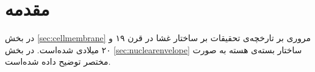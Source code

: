 \setRL
\clearpage
{} 

\def \MemBio {\Mempath /MembraneBio}

\section{
مقدمه
}
در بخش
\ref{sec:cellmembrane}
مروری بر تارخچه‌ی تحقیقات بر ساختار غشا در قرن ۱۹ و ۲۰ میلادی شده‌است. در بخش
\ref{sec:nuclearenvelope}
ساختار بسته‌ی هسته به صورت مختصر توضیح داده شده‌است.

